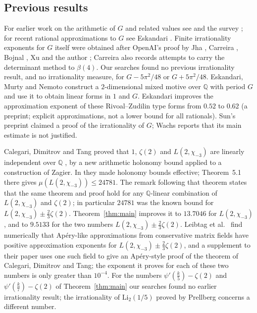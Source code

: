 \documentclass[11pt]{amsart}
\theoremstyle{definition}
\theoremstyle{remark}
\numberwithin{equation}{section}
\newcommand{\Q}{\mathbb Q}
\newcommand{\MuThirdsU}{9.5133}
\newcommand{\MuChi}{13.7046}
\begin{document}
\subsection{Previous results}
For earlier work on the arithmetic of $G$ and related values see
\cite{RivoalZudilin2003,Zudilin2003,Zudilin02Cheb,KrattRivoal08,KrattZudilin19} and the survey
\cite{Zudilin19Survey}; for recent rational approximations to $G$ see Eskandari \cite{Eskandari2026}. Finite
irrationality exponents for $G$ itself were obtained after OpenAI's proof by Jha \cite{Jha2026}, Carreira
\cite{Carreira2026}, Bojnal \cite{Bojnal2026}, Xu \cite{Xu2026} and the author \cite{Litsey2026}; Carreira \cite{Carreira2026b} also records attempts to carry the
determinant method to $\beta(4)$. Our searches found no previous irrationality result, and no irrationality measure, for $G-5\pi^2/48$ or $G+5\pi^2/48$.
Eskandari, Murty and Nemoto \cite{EMN2025} construct a $2$-dimensional mixed motive over $\Q$ with period $G$ and
use it to obtain linear forms in $1$ and $G$. Eskandari \cite{Eskandari2026} improves the approximation exponent of these
Rivoal--Zudilin type forms from $0.52$ to $0.62$ (a preprint; explicit approximations, not a lower bound for all
rationals). Sun's preprint \cite{Sun2026} claimed a proof of the irrationality of $G$; Wachs \cite{Wachs2026} reports that
its main estimate is not justified.

Calegari, Dimitrov and Tang proved that $1$, $\zeta(2)$ and $L(2,\chi_{-3})$ are linearly independent over
$\Q$ \cite{CDT2024}, by a new arithmetic holonomy bound applied to a construction of Zagier. In
\cite{CDT2025} they made holonomy bounds effective; Theorem~5.1 there gives $\mu(L(2,\chi_{-3}))\le24781$.
The remark following that theorem states that the same theorem and proof hold for any $\Q$-linear combination of
$L(2,\chi_{-3})$ and $\zeta(2)$; in particular $24781$ was the known bound for $L(2,\chi_{-3})\pm\frac23\zeta(2)$.
Theorem~\ref{thm:main} improves it to $\MuChi$ for $L(2,\chi_{-3})$, and to $\MuThirdsU$ for the
two numbers $L(2,\chi_{-3})\pm\frac23\zeta(2)$. Leibtag et al.\ \cite{LBKWSK26} find numerically that
Ap\'ery-like approximations from conservative matrix fields have positive approximation exponents for
$L(2,\chi_{-3})\pm\frac23\zeta(2)$, and a supplement to their paper uses one such field to give an Ap\'ery-style
proof of the theorem of Calegari, Dimitrov and Tang; the exponent it proves for each of these two numbers is only greater than $10^{-4}$.
For the numbers $\psi'(\frac k5)-\zeta(2)$ and $\psi'(\frac k7)-\zeta(2)$ of Theorem~\ref{thm:main} our searches found no earlier irrationality result; the irrationality of $\mathrm{Li}_2(1/5)$ proved by Prellberg \cite{Prellberg26}
concerns a different number.
\end{document}
